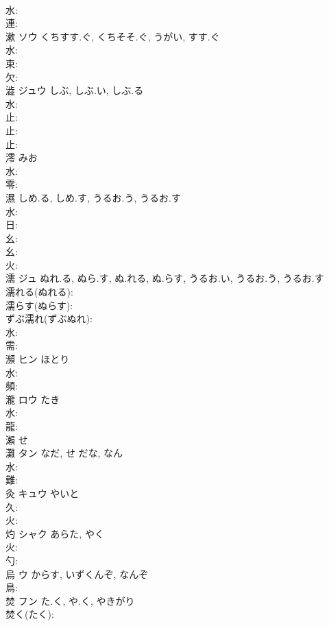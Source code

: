 \documentclass[8pt]{extreport}
\begin{document}
\begin{CJK}{UTF8}{min}
\\	水: 
\\	連: 
\\	漱	ソウ	くちすす.ぐ, くちそそ.ぐ, うがい, すす.ぐ		
\\	水: 
\\	束: 
\\	欠: 
\\	澁	ジュウ	しぶ, しぶ.い, しぶ.る				
\\	水: 
\\	止: 
\\	止: 
\\	止: 
\\	澪		みお				
\\	水: 
\\	零: 
\\	濕		しめ.る, しめ.す, うるお.う, うるお.す				
\\	水: 
\\	日: 
\\	幺: 
\\	幺: 
\\	火: 
\\	濡	ジュ	ぬれ.る, ぬら.す, ぬ.れる, ぬ.らす, うるお.い, うるお.う, うるお.す		
\\	濡れる(ぬれる): 
\\	濡らす(ぬらす): 
\\	ずぶ濡れ(ずぶぬれ): 
\\	水: 
\\	需: 
\\	瀕	ヒン	ほとり		
\\	水: 
\\	頻: 
\\	瀧	ロウ	たき		
\\	水: 
\\	龍: 
\\	瀨		せ				
\\	灘	タン	なだ, せ	だな, なん	
\\	水: 
\\	難: 
\\	灸	キュウ	やいと		
\\	久: 
\\	火: 
\\	灼	シャク	あらた, やく		
\\	火: 
\\	勺: 
\\	烏	ウ	からす, いずくんぞ, なんぞ		
\\	鳥: 
\\	焚	フン	た.く, や.く, やきがり		
\\	焚く(たく): 

\end{CJK}
\end{document}
